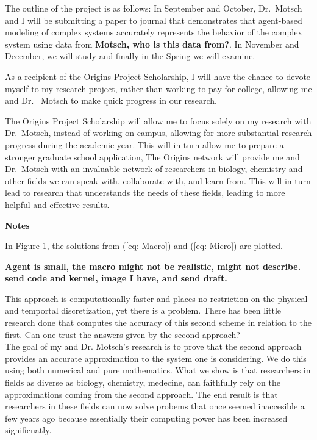 \documentclass[8 pt, leqno]{article}
\begin{document}
The outline of the project is as follows: In September and October, Dr.\ Motsch and I will be submitting a paper to journal that demonstrates that agent-based modeling of complex systems accurately represents the behavior of the complex system using data from \textbf{Motsch, who is this data from?}. In November and December, we will study  and finally in the Spring we will examine. 


As a recipient of the Origins Project Scholarship, I will have the chance to devote myself to my research project, rather than working to pay for college, allowing me and Dr. \ Motsch to make quick progress in our research.  

The Origins Project Scholarship will allow me to focus solely on my research with Dr.\ Motsch, instead of working on campus, allowing for more substantial research progress during the academic year. This will in turn allow me to prepare a stronger graduate school application, 
 The Origins network will provide me and Dr.\ Motsch with an invaluable network of researchers in biology, chemistry and other fields we can speak with, collaborate with, and learn from. This will in turn lead to research that understands the needs of these fields, leading to more helpful and effective results. 


\newpage 
\begin{center}
\textbf{Notes}
\end{center}

 In Figure 1,
the solutions from (\ref{eq: Macro}) and (\ref{eq: Micro}) are plotted.

\textbf{Agent is small, the macro might not be realistic, might not describe. send code and kernel, image I have, and send draft.}

This approach is computationally faster and places no restriction on the physical and temportal discretization, yet there is a problem. There has been little research done that computes the accuracy of this second scheme in relation to the first. Can one trust the answers given by the second approach? \\
The goal of my and Dr. Motsch's research is to prove that the second approach provides an accurate approximation to the system one is considering. We do this using both numerical and pure mathematics. What we show is that researchers in fields as diverse as biology, chemistry, medecine, can faithfully rely on the approximations coming from the second approach. The end result is that researchers in these fields can now solve probems that once seemed inaccesible a few years ago because essentially their computing power has been increased significnatly. 
\end{document}
